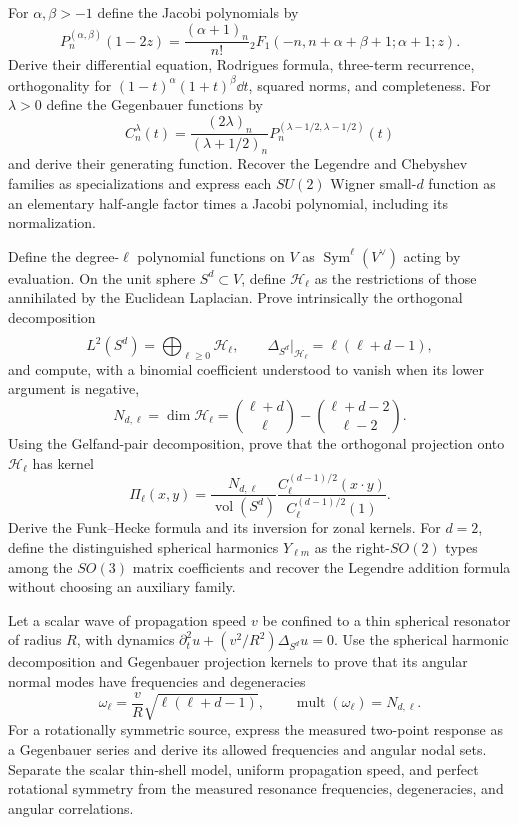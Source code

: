 \begin{exercise}
For $\alpha,\beta>-1$ define the Jacobi polynomials by
\[
 P_n^{(\alpha,\beta)}(1-2z)
 =\frac{(\alpha+1)_n}{n!}
 {}_2F_1(-n,n+\alpha+\beta+1;\alpha+1;z).
\]
Derive their differential equation, Rodrigues formula, three-term recurrence,
orthogonality for $(1-t)^\alpha(1+t)^\beta\dd t$, squared norms, and
completeness.  For $\lambda>0$ define the Gegenbauer functions by
\[
 C_n^\lambda(t)=
 \frac{(2\lambda)_n}{(\lambda+1/2)_n}
 P_n^{(\lambda-1/2,\lambda-1/2)}(t)
\]
and derive their generating function.  Recover the Legendre and Chebyshev
families as specializations and
express each $SU(2)$ Wigner small-$d$ function as an elementary half-angle
factor times a Jacobi polynomial, including its normalization.
\end{exercise}

\begin{exercise}
Define the degree-$\ell$ polynomial functions on $V$ as
$\operatorname{Sym}^\ell(V^\vee)$ acting by evaluation.  On the unit sphere
$S^d\subset V$, define $\mathcal H_\ell$ as the restrictions of those
annihilated by the Euclidean Laplacian.  Prove intrinsically the orthogonal decomposition
\[
 L^2(S^d)=\widehat\bigoplus_{\ell\geq0}\mathcal H_\ell,
 \qquad
 \Delta_{S^d}|_{\mathcal H_\ell}=\ell(\ell+d-1),
\]
and compute, with a binomial coefficient understood to vanish when its lower
argument is negative,
\[
 N_{d,\ell}=\dim\mathcal H_\ell
 =\binom{\ell+d}{\ell}-\binom{\ell+d-2}{\ell-2}.
\]
Using the Gelfand-pair decomposition, prove that the orthogonal projection
onto $\mathcal H_\ell$ has kernel
\[
 \Pi_\ell(x,y)=\frac{N_{d,\ell}}{\operatorname{vol}(S^d)}
 \frac{C_\ell^{(d-1)/2}(x\cdot y)}
 {C_\ell^{(d-1)/2}(1)}.
\]
Derive the Funk--Hecke formula and its inversion for zonal kernels.  For
$d=2$, define the distinguished spherical harmonics $Y_{\ell m}$ as the
right-$SO(2)$ types among the $SO(3)$ matrix coefficients and recover the
Legendre addition formula without choosing an auxiliary family.
\end{exercise}

\begin{exercise}
Let a scalar wave of propagation speed $v$ be confined to a thin spherical
resonator of radius $R$, with dynamics
$\partial_t^2u+(v^2/R^2)\Delta_{S^d}u=0$.  Use the spherical harmonic
decomposition and Gegenbauer projection kernels to prove that its angular
normal modes have frequencies and degeneracies
\[
 \omega_\ell=\frac vR\sqrt{\ell(\ell+d-1)},
 \qquad \operatorname{mult}(\omega_\ell)=N_{d,\ell}.
\]
For a rotationally symmetric source, express the measured two-point response
as a Gegenbauer series and derive its allowed frequencies and angular nodal
sets.  Separate the scalar thin-shell model, uniform propagation speed, and
perfect rotational symmetry from the measured resonance frequencies,
degeneracies, and angular correlations.
\end{exercise}

